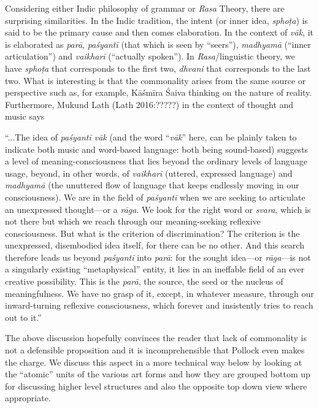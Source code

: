 \newpage

Considering either Indic philosophy of grammar or \textsl{Rasa} Theory, there are surprising similarities. In the Indic tradition, the intent (or inner idea, \textsl{sphoṭa}) is said to be the primary cause and then comes elaboration. In the context of \textsl{vāk}, it is elaborated as \textsl{parā}, \textsl{paśyantī} (that which is seen by “seers”), \textsl{madhyamā} (“inner articulation”) and \textsl{vaikharī} (“actually spoken”). In \textsl{Rasa}/linguistic theory, we have \textsl{sphoṭa} that corresponds to the first two, \textsl{dhvani} that corresponds to the last two. What is interesting is that the commonality arises from the same source or perspective such as, for example, Kāśmīra Śaiva thinking on the nature of reality. Furthermore, Mukund Lath (Lath 2016:?????) in the context of thought and music says 

\begin{myquote}
“...The idea of \textsl{paśyantī vāk} (and the word “\textsl{vāk}” here, can be plainly taken to indicate both music and word-based language: both being sound-based) suggests a level of meaning-consciousness that lies beyond the ordinary levels of language usage, beyond, in other words, of \textsl{vaikharī} (uttered, expressed language) and \textsl{madhyamā} (the unuttered flow of language that keeps endlessly moving in our consciousness). We are in the field of \textsl{paśyantī} when we are seeking to articulate an unexpressed thought—or a \textsl{rāga}. We look for the right word or \textsl{svara}, which is not there but which we reach through our meaning-seeking reflexive consciousness. But what is the criterion of discrimination? The criterion is the unexpressed, disembodied idea itself, for there can be no other. And this search therefore leads us beyond \textsl{paśyantī} into \textsl{parā}: for the sought idea---or \textsl{rāga}---is not a singularly existing “metaphysical” entity, it lies in an ineffable field of an ever creative possibility. This is the \textsl{parā}, the source, the seed or the nucleus of meaningfulness. We have no grasp of it, except, in whatever measure, through our inward-turning reflexive consciousness, which forever and insistently tries to reach out to it.”
\end{myquote}

The above discussion hopefully convinces the reader that lack of commonality is not a defensible proposition and it is incomprehensible that Pollock even makes the charge. We discuss this aspect in a more technical way below by looking at the “atomic” units of the various art forms and how they are grouped bottom up for discussing higher level structures and also the opposite top down view where appropriate.

